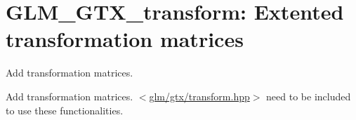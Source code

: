 \hypertarget{group__gtx__transform}{\section{\-G\-L\-M\-\_\-\-G\-T\-X\-\_\-transform\-: \-Extented transformation matrices}
\label{group__gtx__transform}
}


\-Add transformation matrices.  


\-Add transformation matrices. $<$\hyperlink{transform_8hpp}{glm/gtx/transform.\-hpp}$>$ need to be included to use these functionalities. 